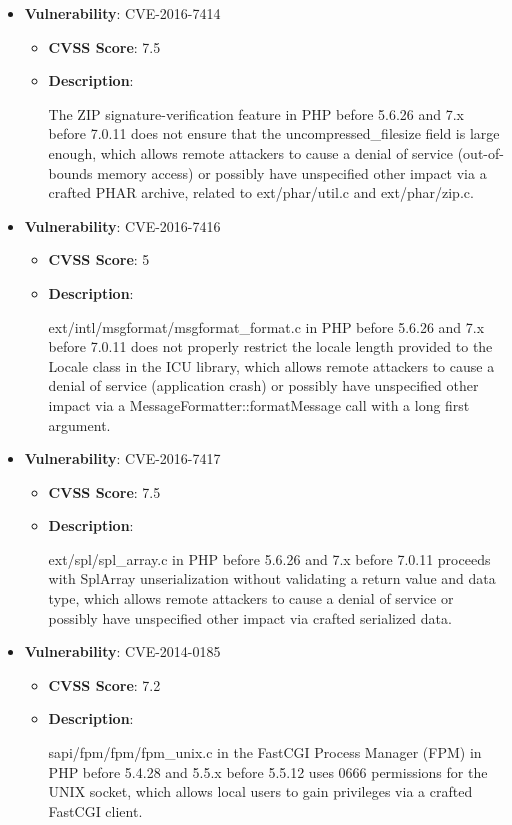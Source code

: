 \documentclass{article}
\begin{document}
\begin{itemize}
        \item \textbf{Vulnerability}: CVE-2016-7414
        \begin{itemize}
            \item \textbf{CVSS Score}:  7.5 
            \item \textbf{Description}:
            \parbox[t]{0.9\linewidth}{
                \ttfamily The ZIP signature-verification feature in PHP before 5.6.26 and 7.x before 7.0.11 does not ensure that the uncompressed\_filesize field is large enough, which allows remote attackers to cause a denial of service (out-of-bounds memory access) or possibly have unspecified other impact via a crafted PHAR archive, related to ext/phar/util.c and ext/phar/zip.c.
            }
        \end{itemize}
    
        \item \textbf{Vulnerability}: CVE-2016-7416
        \begin{itemize}
            \item \textbf{CVSS Score}:  5 
            \item \textbf{Description}:
            \parbox[t]{0.9\linewidth}{
                \ttfamily ext/intl/msgformat/msgformat\_format.c in PHP before 5.6.26 and 7.x before 7.0.11 does not properly restrict the locale length provided to the Locale class in the ICU library, which allows remote attackers to cause a denial of service (application crash) or possibly have unspecified other impact via a MessageFormatter::formatMessage call with a long first argument.
            }
        \end{itemize}
    
        \item \textbf{Vulnerability}: CVE-2016-7417
        \begin{itemize}
            \item \textbf{CVSS Score}:  7.5 
            \item \textbf{Description}:
            \parbox[t]{0.9\linewidth}{
                \ttfamily ext/spl/spl\_array.c in PHP before 5.6.26 and 7.x before 7.0.11 proceeds with SplArray unserialization without validating a return value and data type, which allows remote attackers to cause a denial of service or possibly have unspecified other impact via crafted serialized data.
            }
        \end{itemize}
    
        \item \textbf{Vulnerability}: CVE-2014-0185
        \begin{itemize}
            \item \textbf{CVSS Score}:  7.2 
            \item \textbf{Description}:
            \parbox[t]{0.9\linewidth}{
                \ttfamily sapi/fpm/fpm/fpm\_unix.c in the FastCGI Process Manager (FPM) in PHP before 5.4.28 and 5.5.x before 5.5.12 uses 0666 permissions for the UNIX socket, which allows local users to gain privileges via a crafted FastCGI client.
            }
        \end{itemize}
    

\end{itemize}
\end{document}
